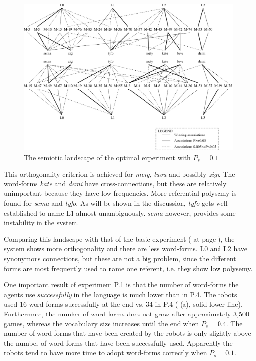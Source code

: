 \begin{figure}[t]
\centerline{\includegraphics[width=12cm]{optimal/semiotic.eps}}
\caption{The semiotic landscape of the optimal experiment with $P_s=0.1$.}
\label{f:opt:semiotic}
\end{figure}

This orthogonality criterion is achieved for {\it mety}, {\it luvu} and possibly {\it zigi}. The word-forms {\it kate} and {\it demi} have cross-connections, but these are relatively unimportant because they have low frequencies. More referential polysemy is found for {\it sema} and {\it tyfo}. As will be shown in the discussion, {\it tyfo} gets well established to name L1 almost unambiguously. {\it sema} however, provides some instability in the system. 

Comparing this landscape with that of the basic experiment ( at page \pageref{f:st:semiotic}), the system shows more orthogonality and there are less word-forms. L0 and L2 have synonymous connections, but these are not a big problem, since the different forms are most frequently used to name one referent, i.e. they show low polysemy.


One important result of experiment P.1 is that the number of word-forms the agents use {\em successfully} in the language is much lower than in P.4. The robots used 16 word-forms successfully at the end vs. 34 in P.4 ( (a), solid lower line). Furthermore, the number of word-forms does not grow after approximately 3,500 games, whereas the vocabulary size increases until the end when $P_s=0.4$. The number of word-forms that have been created by the robots is only slightly above the number of word-forms that have been successfully used. Apparently the robots tend to have more time to adopt word-forms correctly when $P_s=0.1$. 


